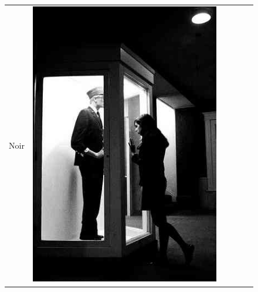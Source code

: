 \begin{figure}
\begin{tabular}{m{.01\linewidth} m{.16\linewidth} m{.16\linewidth} m{.16\linewidth} m{.16\linewidth} m{.16\linewidth}}
    \begin{turn}{90}{Noir}\end{turn} &
    \includegraphics[width=\linewidth]{../style/figures/flickr_on_flickr/pred_style_Noir/0.jpg} &

\end{tabular}
\end{figure}
